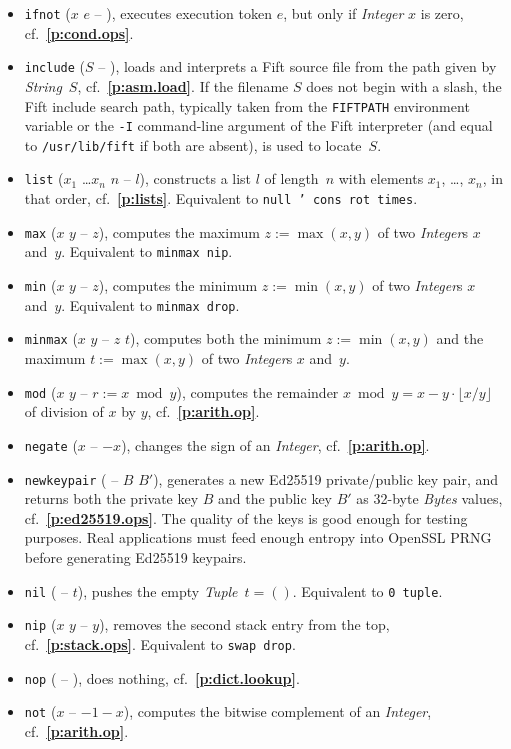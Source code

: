 \documentclass[12pt,oneside]{article}
\def\refpoint#1{{\rm\textbf{\ref{#1}}}}
\let\ptref=\refpoint
\begin{document}
\begin{itemize}
\item {\tt ifnot} ($x$ $e$ -- ), executes execution token $e$, but only if {\em Integer\/} $x$ is zero, cf.~\ptref{p:cond.ops}.
\item {\tt include} ($S$ -- ), loads and interprets a Fift source file from the path given by {\em String\/}~$S$, cf.~\ptref{p:asm.load}. If the filename $S$ does not begin with a slash, the Fift include search path, typically taken from the {\tt FIFTPATH} environment variable or the {\tt -I} command-line argument of the Fift interpreter (and equal to {\tt /usr/lib/fift} if both are absent), is used to locate~$S$.
\item {\tt list} ($x_1$ \dots $x_n$ $n$ -- $l$), constructs a list $l$ of length~$n$ with elements $x_1$, \ldots, $x_n$, in that order, cf.~\ptref{p:lists}. Equivalent to {\tt null ' cons rot times}.
\item {\tt max} ($x$ $y$ -- $z$), computes the maximum $z:=\max(x,y)$ of two {\em Integer\/}s $x$ and~$y$. Equivalent to {\tt minmax nip}.
\item {\tt min} ($x$ $y$ -- $z$), computes the minimum $z:=\min(x,y)$ of two {\em Integer\/}s $x$ and~$y$. Equivalent to {\tt minmax drop}.
\item {\tt minmax} ($x$ $y$ -- $z$ $t$), computes both the minimum $z:=\min(x,y)$ and the maximum $t:=\max(x,y)$ of two {\em Integer\/}s $x$ and~$y$.
\item {\tt mod} ($x$ $y$ -- $r:=x\bmod y$), computes the remainder $x\bmod y=x-y\cdot\lfloor x/y\rfloor$ of division of $x$ by $y$, cf.~\ptref{p:arith.op}.
\item {\tt negate} ($x$ -- $-x$), changes the sign of an {\em Integer}, cf.~\ptref{p:arith.op}.
\item {\tt newkeypair} ( -- $B$ $B'$), generates a new Ed25519 private/public key pair, and returns both the private key $B$ and the public key $B'$ as 32-byte {\em Bytes\/} values, cf.~\ptref{p:ed25519.ops}. The quality of the keys is good enough for testing purposes. Real applications must feed enough entropy into OpenSSL PRNG before generating Ed25519 keypairs.
\item {\tt nil} ( -- $t$), pushes the empty {\em Tuple\/}~$t=()$. Equivalent to {\tt 0 tuple}.
\item {\tt nip} ($x$ $y$ -- $y$), removes the second stack entry from the top, cf.~\ptref{p:stack.ops}. Equivalent to {\tt swap drop}.
\item {\tt nop} ( -- ), does nothing, cf.~\ptref{p:dict.lookup}.
\item {\tt not} ($x$ -- $-1-x$), computes the bitwise complement of an {\em Integer}, cf.~\ptref{p:arith.op}.

\end{itemize}
\end{document}
